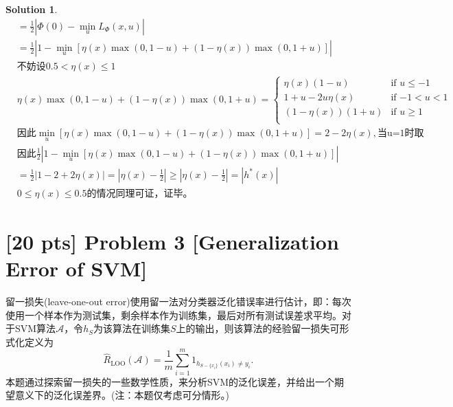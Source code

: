 \documentclass[a4paper,UTF8]{article}
\theoremstyle{definition}
\newtheorem*{solution}{Solution}
\begin{document}
\begin{solution}
\begin{equation*}
\begin{split}
		&=\frac{1}{2}|\Phi(0)- \min_u L_\Phi(x,u) |\\
		&=\frac{1}{2}|1-\min_u [\eta(x)\max(0,1-u)+(1-\eta(x))\max(0,1+u)] |\\
		&\text{不妨设} 0.5<\eta(x)\le 1\\
		&\eta(x)\max(0,1-u)+(1-\eta(x))\max(0,1+u) = 
		\begin{cases}
			\eta(x)(1-u)&\mbox{if $u \le -1$}\\
			1+u-2u\eta(x)&\mbox{if $-1<u<1$}\\
			(1-\eta(x))(1+u)&\mbox{if $u \ge 1$}\\
		\end{cases}\\
		&\text{因此}\min_u [\eta(x)\max(0,1-u)+(1-\eta(x))\max(0,1+u)] = 2-2\eta(x), \text{当u=1时取}\\
		&\text{因此}\frac{1}{2}|1-\min_u [\eta(x)\max(0,1-u)+(1-\eta(x))\max(0,1+u)] |\\
		&=\frac{1}{2}|1-2+2\eta(x)| = |\eta(x)-\frac{1}{2}| \ge |\eta(x)-\frac{1}{2}| = |h^*(x)|\\
		&0\le \eta(x) \le 0.5\text{的情况同理可证，证毕。}
	\end{split}
\end{equation*}
\end{solution}

\section*{[20 pts] Problem 3 [Generalization Error of SVM]}

留一损失(leave-one-out error)使用留一法对分类器泛化错误率进行估计，即：每次使用一个样本作为测试集，剩余样本作为训练集，最后对所有测试误差求平均。对于SVM算法$\mathcal{A}$，令$h_S$为该算法在训练集$S$上的输出，则该算法的经验留一损失可形式化定义为
\begin{equation}
	\hat{R}_{\text{LOO}}(\mathcal{A}) = \frac{1}{m} \sum_{i=1}^m 1_{ h_{ S-\{x_i\} } (x_i) \neq y_i } . 
\end{equation}
本题通过探索留一损失的一些数学性质，来分析SVM的泛化误差，并给出一个期望意义下的泛化误差界。(注：本题仅考虑可分情形。)
\end{document}
